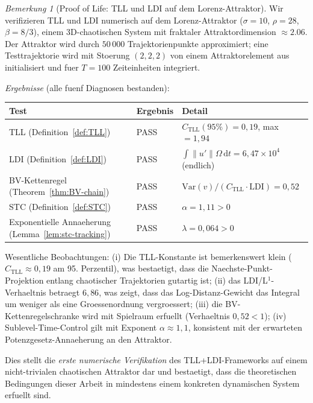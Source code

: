 \documentclass[12pt,a4paper]{article}
\theoremstyle{definition}
\theoremstyle{plain}
\theoremstyle{remark}
\newtheorem{remark}[definition]{Bemerkung}
\begin{document}
\begin{remark}[Proof of Life: TLL und LDI auf dem Lorenz-Attraktor]
\label{rem:tll-ldi-lorenz}
Wir verifizieren TLL und LDI numerisch auf dem Lorenz-Attraktor ($\sigma = 10$, $\rho = 28$, $\beta = 8/3$), einem 3D-chaotischen System mit fraktaler Attraktordimension $\approx 2.06$. Der Attraktor wird durch $50\,000$ Trajektorienpunkte approximiert; eine Testtrajektorie wird mit Stoerung $(2, 2, 2)$ von einem Attraktorelement aus initialisiert und fuer $T = 100$ Zeiteinheiten integriert.

\emph{Ergebnisse} (alle fuenf Diagnosen bestanden):

\begin{center}
\small
\begin{tabular}{l|l|l}
\textbf{Test} & \textbf{Ergebnis} & \textbf{Detail} \\
\hline
TLL (Definition~\ref{def:TLL}) & PASS & $C_{\mathrm{TLL}}(95\%) = 0{,}19$, max $= 1{,}94$ \\
LDI (Definition~\ref{def:LDI}) & PASS & $\int \|u'\| \Omega\,\mathrm{d}t = 6{,}47 \times 10^4$ (endlich) \\
BV-Kettenregel (Theorem~\ref{thm:BV-chain}) & PASS & $\mathrm{Var}(v) / (C_{\mathrm{TLL}} \cdot \mathrm{LDI}) = 0{,}52$ \\
STC (Definition~\ref{def:STC}) & PASS & $\alpha = 1{,}11 > 0$ \\
Exponentielle Annaeherung (Lemma~\ref{lem:stc-tracking}) & PASS & $\lambda = 0{,}064 > 0$
\end{tabular}
\end{center}

Wesentliche Beobachtungen: (i) Die TLL-Konstante ist bemerkenswert klein ($C_{\mathrm{TLL}} \approx 0{,}19$ am 95. Perzentil), was bestaetigt, dass die Naechste-Punkt-Projektion entlang chaotischer Trajektorien gutartig ist; (ii) das LDI/L$^1$-Verhaeltnis betraegt $6{,}86$, was zeigt, dass das Log-Distanz-Gewicht das Integral um weniger als eine Groessenordnung vergroessert; (iii) die BV-Kettenregelschranke wird mit Spielraum erfuellt (Verhaeltnis $0{,}52 < 1$); (iv) Sublevel-Time-Control gilt mit Exponent $\alpha \approx 1{,}1$, konsistent mit der erwarteten Potenzgesetz-Annaeherung an den Attraktor.

Dies stellt die \emph{erste numerische Verifikation} des TLL+LDI-Frameworks auf einem nicht-trivialen chaotischen Attraktor dar und bestaetigt, dass die theoretischen Bedingungen dieser Arbeit in mindestens einem konkreten dynamischen System erfuellt sind.
\end{remark}
\end{document}
